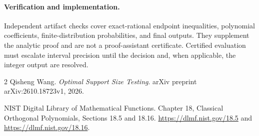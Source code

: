\documentclass[10pt]{article}
\begin{document}
\paragraph{Verification and implementation.}
Independent artifact checks cover exact-rational endpoint inequalities,
polynomial coefficients, finite-distribution probabilities, and final
outputs. They supplement the analytic proof and are not a proof-assistant
certificate. Certified evaluation must escalate interval precision until
the decision and, when applicable, the integer output are resolved.

\begin{thebibliography}{2}
Qisheng Wang.
\newblock \emph{Optimal Support Size Testing}.
\newblock arXiv preprint arXiv:2610.18723v1, 2026.

NIST Digital Library of Mathematical Functions.
\newblock Chapter 18, Classical Orthogonal Polynomials, Sections 18.5 and 18.16.
\newblock \url{https://dlmf.nist.gov/18.5} and \url{https://dlmf.nist.gov/18.16}.
\end{thebibliography}
\end{document}
